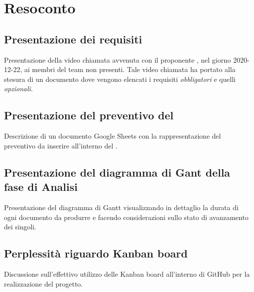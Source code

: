 \section{Resoconto}

\subsection{Presentazione dei requisiti}
Presentazione della video chiamata avvenuta con il proponente \Proponente{}, nel giorno 2020-12-22, ai membri del team non presenti. Tale video chiamata ha portato alla stesura di un documento dove vengono elencati i requisiti \textit{obbligatori} e quelli \textit{opzionali}.

\subsection{Presentazione del preventivo del \PdP}
Descrizione di un documento Google Sheets con la rappresentazione del preventivo da inserire all'interno del \PdP.

\subsection{Presentazione del diagramma di Gant della fase di Analisi}
Presentazione del diagramma di Gantt visualizzando in dettaglio la durata di ogni documento da produrre e facendo considerazioni sullo stato di avanzamento dei singoli.

\subsection{Perplessità riguardo Kanban board}
Discussione sull'effettivo utilizzo delle Kanban board all'interno di GitHub per la realizzazione del progetto.